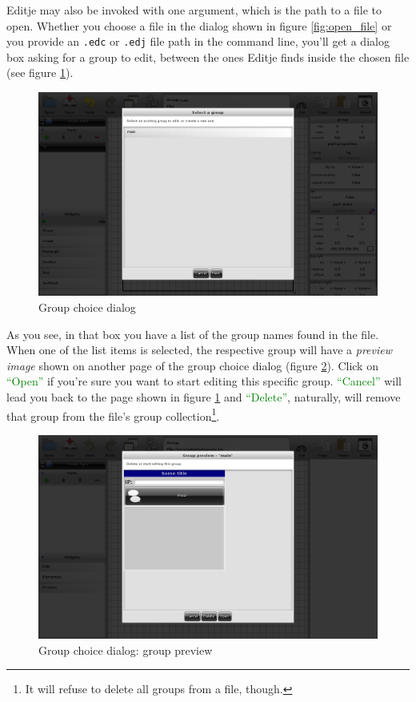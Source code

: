 \documentclass[a4paper]{profusion}
\newcommand{\GUIButton}[1]{\textcolor{green}{#1}} %
\begin{document}
Editje may also be invoked with one argument, which is the path to a
file to open. Whether you choose a file in the dialog shown in figure
\ref{fig:open_file} or you provide an \texttt{.edc} or \texttt{.edj}
file path in the command line, you'll get a dialog box asking for a
group to edit, between the ones Editje finds inside the chosen file
(see figure \ref{fig:choose_group}).

\begin{figure}[h!]
  \centering
  \includegraphics[width=1.0\textwidth]{images/choose_group.png}
  \caption{Group choice dialog}
  \label{fig:choose_group}
\end{figure}

As you see, in that box you have a list of the group names found in
the file. When one of the list items is selected, the respective group
will have a \emph{preview image} shown on another page of the group
choice dialog (figure \ref{fig:group_preview}). Click on
\GUIButton{``Open''} if you're sure you want to start editing this
specific group. \GUIButton{``Cancel''} will lead you back to the page
shown in figure \ref{fig:choose_group} and \GUIButton{``Delete''},
naturally, will remove that group from the file's group
collection\footnote{It will refuse to delete all groups from a file,
  though.}.

\begin{figure}[h!]
  \centering
  \includegraphics[width=1.0\textwidth]{images/group_preview.png}
  \caption{Group choice dialog: group preview}
  \label{fig:group_preview}
\end{figure}
\end{document}

